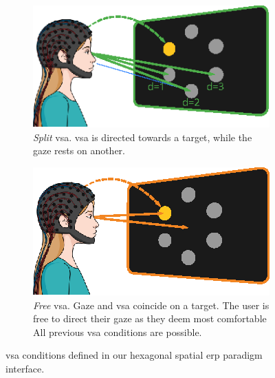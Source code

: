 \begin{figure}
  \begin{subfigure}[t]{.45\textwidth}
    \includegraphics[width=\textwidth]{figures/gaze_independence/attention_split.eps}
    \caption[Split \ac{vsa}]{%
      \emph{Split} \ac{vsa}.
      \Ac{vsa} is directed towards a target, while the gaze rests on another.
    }
    \label{fig:gaze/vsa/overt}
  \end{subfigure}\hfill%
   \begin{subfigure}[t]{.45\textwidth}
    \includegraphics[width=\textwidth]{figures/gaze_independence/attention_free.eps}
    \caption[Free \ac{vsa}]{%
      \emph{Free} \ac{vsa}.
      Gaze and \ac{vsa} coincide on a target.
      The user is free to direct their gaze as they deem most comfortable
      All previous \ac{vsa} conditions are possible.
    }
    \label{fig:gaze/vsa/overt}
  \end{subfigure}\hfill%
  \caption[\Ac{vsa} conditions]{%
    \Ac{vsa} conditions defined in our hexagonal spatial \ac{erp} paradigm interface.
  }
  \label{fig:gaze-vsa}
\end{figure}

